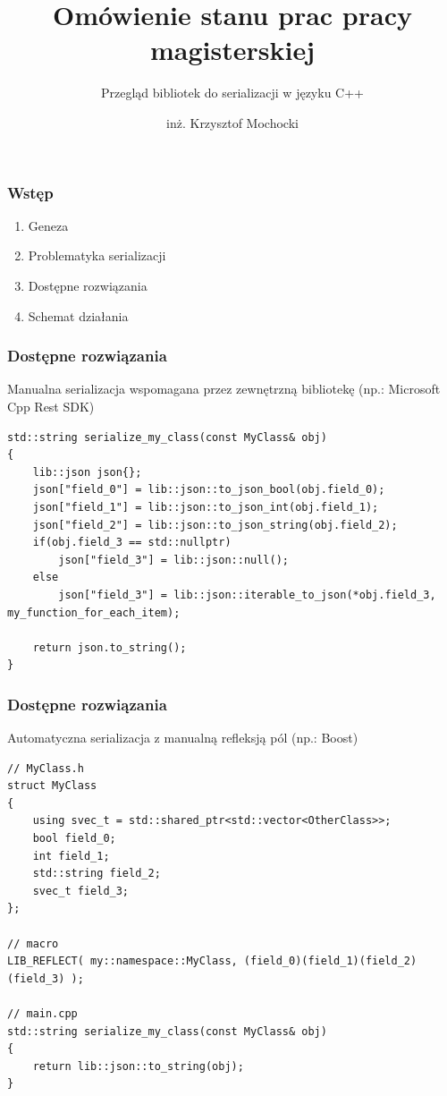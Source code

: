 \documentclass[12pt]{beamer}
\title{Omówienie stanu prac pracy magisterskiej}
\subtitle{Przegląd bibliotek do serializacji w języku C++}
\author[inż. Krzysztof Mochocki]{inż. Krzysztof Mochocki}
\date{}
\begin{document}
	\begin{frame}
		\maketitle
	\end{frame}

	\begin{frame}
		\frametitle{Wstęp}
		\begin{enumerate}
			\item Geneza
			\item Problematyka serializacji
			\item Dostępne rozwiązania
			\item Schemat działania
		\end{enumerate}
	\end{frame}

	\begin{frame}[fragile]
		\frametitle{Dostępne rozwiązania}

		Manualna serializacja wspomagana przez zewnętrzną bibliotekę (np.: Microsoft Cpp Rest SDK)\newline

		\begin{lstlisting}[frame=single]
std::string serialize_my_class(const MyClass& obj)
{
	lib::json json{};
	json["field_0"] = lib::json::to_json_bool(obj.field_0);
	json["field_1"] = lib::json::to_json_int(obj.field_1);
	json["field_2"] = lib::json::to_json_string(obj.field_2);
	if(obj.field_3 == std::nullptr)
		json["field_3"] = lib::json::null();
	else
		json["field_3"] = lib::json::iterable_to_json(*obj.field_3, my_function_for_each_item);

	return json.to_string();
}
		\end{lstlisting}

	\end{frame}

	\begin{frame}[fragile]
		\frametitle{Dostępne rozwiązania}

		Automatyczna serializacja z manualną refleksją pól \newline(np.: Boost)

		\begin{lstlisting}[frame=single]
// MyClass.h
struct MyClass
{
	using svec_t = std::shared_ptr<std::vector<OtherClass>>;
	bool field_0;
	int field_1;
	std::string field_2;
	svec_t field_3;
};

// macro
LIB_REFLECT( my::namespace::MyClass, (field_0)(field_1)(field_2)(field_3) );

// main.cpp
std::string serialize_my_class(const MyClass& obj)
{
	return lib::json::to_string(obj);
}
		\end{lstlisting}

	\end{frame}
\end{document}
